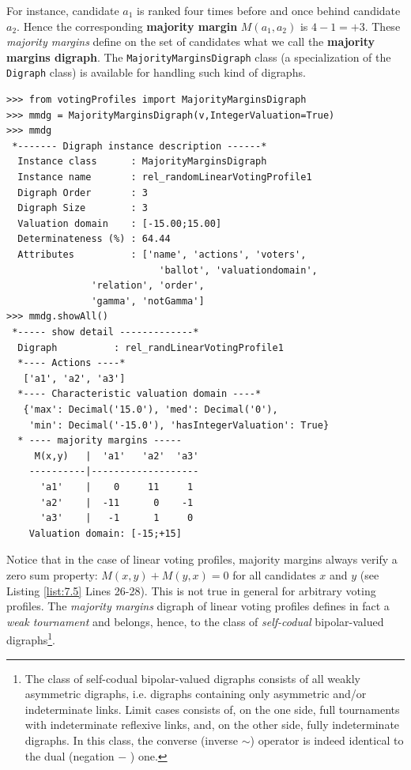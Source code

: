 For instance, candidate $a_1$ is ranked four times before and once behind candidate $a_2$. Hence the corresponding \textbf{majority margin} $M(a_1,a_2)$ is $4 - 1 = +3$. These \emph{majority margins} define on the set of candidates what we call the \textbf{majority margins digraph}. The \texttt{MajorityMarginsDigraph} class (a specialization of the \texttt{Digraph} class) is available for handling such kind of digraphs.

\begin{lstlisting}[caption={Example of \emph{Majority Margins} digraph},label=list:7.5,basicstyle=\footnotesize]
>>> from votingProfiles import MajorityMarginsDigraph
>>> mmdg = MajorityMarginsDigraph(v,IntegerValuation=True)
>>> mmdg
 *------- Digraph instance description ------*
  Instance class      : MajorityMarginsDigraph
  Instance name       : rel_randomLinearVotingProfile1
  Digraph Order       : 3
  Digraph Size        : 3
  Valuation domain    : [-15.00;15.00]
  Determinateness (%) : 64.44
  Attributes          : ['name', 'actions', 'voters',
                           'ballot', 'valuationdomain',
			   'relation', 'order',
			   'gamma', 'notGamma']
>>> mmdg.showAll()
 *----- show detail -------------*
  Digraph          : rel_randLinearVotingProfile1
  *---- Actions ----*
   ['a1', 'a2', 'a3']
  *---- Characteristic valuation domain ----*
   {'max': Decimal('15.0'), 'med': Decimal('0'),
    'min': Decimal('-15.0'), 'hasIntegerValuation': True}
  * ---- majority margins -----
     M(x,y)   |  'a1'	'a2'  'a3'	  
    ----------|-------------------
      'a1'    |    0     11     1	 
      'a2'    |  -11      0    -1	 
      'a3'    |   -1      1     0	 
    Valuation domain: [-15;+15]
\end{lstlisting}

Notice that in the case of linear voting profiles, majority margins always verify a zero sum property: $M(x,y) + M(y,x) = 0$ for all candidates $x$ and $y$ (see Listing \ref{list:7.5} Lines 26-28). This is not true in general for arbitrary voting profiles. The \emph{majority margins} digraph of linear voting profiles defines in fact a \emph{weak tournament} and belongs, hence, to the class of \emph{self-codual} bipolar-valued digraphs\footnote{The class of self-codual bipolar-valued digraphs consists of all weakly asymmetric digraphs, i.e. digraphs containing only asymmetric and/or indeterminate links. Limit cases consists of, on the one side, full tournaments with indeterminate reflexive links, and, on the other side, fully indeterminate digraphs. In this class, the converse (inverse $\sim$) operator is indeed identical to the dual (negation $-$ ) one.}.
    
